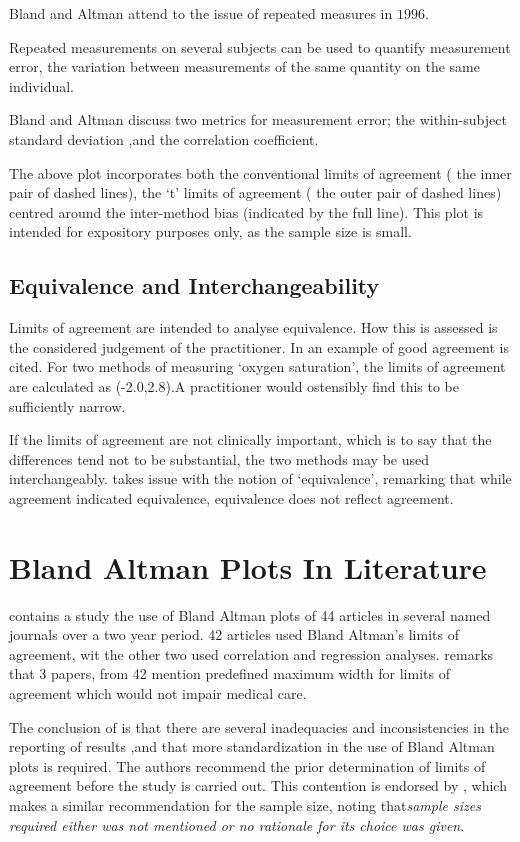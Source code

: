 \documentclass[12pt, a4paper]{report}
\begin{document}
Bland and Altman attend to the issue of repeated measures in
$1996$.

Repeated measurements on several subjects can be used to quantify
measurement error, the variation between measurements of the same
quantity on the same individual.

Bland and Altman discuss two metrics for measurement error; the
within-subject standard deviation ,and the correlation
coefficient.

The above plot incorporates both the conventional limits of
agreement ( the inner pair of dashed lines), the `t' limits of
agreement ( the outer pair of dashed lines) centred around the
inter-method bias (indicated by the full line). This plot is
intended for expository purposes only, as the sample size is
small.





\subsection{Equivalence and Interchangeability}
Limits of agreement are intended to analyse equivalence. How this
is assessed is the considered judgement of the practitioner. In
\citet{BA86} an example of good agreement is cited. For two
methods of measuring `oxygen saturation', the limits of agreement
are calculated as (-2.0,2.8).A practitioner would ostensibly find
this to be sufficiently narrow.

If the limits of agreement are not clinically important, which is
to say that the differences tend not to be substantial, the two
methods may be used interchangeably. \citet{DunnSEME} takes issue
with the notion of `equivalence', remarking that while agreement
indicated equivalence, equivalence does not reflect agreement.




\section{Bland Altman Plots In Literature}
\citet{mantha} contains a study the use of Bland Altman plots of
44 articles in several named journals over a two year period. 42
articles used Bland Altman's limits of agreement, wit the other
two used correlation and regression analyses. \citet{mantha}
remarks that 3 papers, from 42 mention predefined maximum width
for limits of agreement which would not impair medical care.

The conclusion of \citet{mantha} is that there are several
inadequacies and inconsistencies in the reporting of results ,and
that more standardization in the use of Bland Altman plots is
required. The authors recommend the prior determination of limits
of agreement before the study is carried out. This contention is
endorsed by \citet{lin}, which makes a similar recommendation for
the sample size, noting that\emph{sample sizes required either was
not mentioned or no rationale for its choice was given}.
\end{document}
